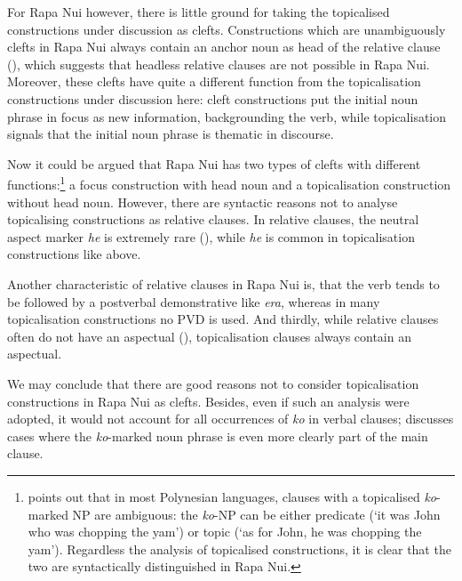 For Rapa Nui however, there is little ground for taking the topicalised constructions under discussion as clefts. Constructions which are unambiguously clefts in Rapa Nui always contain an anchor noun as head of the relative clause (), which suggests that headless relative clauses are not possible in Rapa Nui. Moreover, these clefts have quite a different function from the topicalisation constructions under discussion here: cleft constructions put the initial noun phrase in focus as new information, backgrounding the verb, while topicalisation signals that the initial noun phrase is thematic in discourse. 

Now it could be argued that Rapa Nui has two types of clefts with different functions:\footnote{\label{fn:426}\citet[38]{Clark1976} points out that in most Polynesian languages, clauses with a topicalised \textit{ko}{}-marked NP are ambiguous: the \textit{ko}{}-NP can be either predicate (‘it was John who was chopping the yam’) or topic (‘as for John, he was chopping the yam’). Regardless the analysis of topicalised constructions, it is clear that the two are syntactically distinguished in Rapa Nui.} a focus construction with head noun and a topicalisation construction without head noun. However, there are syntactic reasons not to analyse topicalising constructions as relative clauses. In relative clauses, the neutral aspect marker \textit{he} is extremely rare (), while \textit{he} is common in topicalisation constructions like  above. 

Another characteristic of relative clauses in Rapa Nui is, that the verb tends to be followed by a postverbal demonstrative like \textit{era}, whereas in many topicalisation constructions no PVD is used. And thirdly, while relative clauses often do not have an aspectual (), topicalisation clauses always contain an aspectual.

We may conclude that there are good reasons not to consider topicalisation constructions in Rapa Nui as clefts. Besides, even if such an analysis were adopted, it would not account for all occurrences of \textit{ko} in verbal clauses;  discusses cases where the \textit{ko}{}-marked noun phrase is even more clearly part of the main clause.

